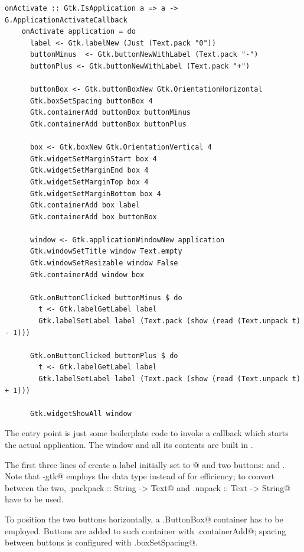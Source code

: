 \documentclass[UdineBachThesis,american,11pt,draft]{PhdThesis}
\begin{document}
  \begin{lstlisting}[gobble=4,basicstyle=\ttfamily\small]
    onActivate :: Gtk.IsApplication a => a -> G.ApplicationActivateCallback
    onActivate application = do
      label <- Gtk.labelNew (Just (Text.pack "0"))
      buttonMinus  <- Gtk.buttonNewWithLabel (Text.pack "-")
      buttonPlus <- Gtk.buttonNewWithLabel (Text.pack "+")

      buttonBox <- Gtk.buttonBoxNew Gtk.OrientationHorizontal
      Gtk.boxSetSpacing buttonBox 4
      Gtk.containerAdd buttonBox buttonMinus
      Gtk.containerAdd buttonBox buttonPlus

      box <- Gtk.boxNew Gtk.OrientationVertical 4
      Gtk.widgetSetMarginStart box 4
      Gtk.widgetSetMarginEnd box 4
      Gtk.widgetSetMarginTop box 4
      Gtk.widgetSetMarginBottom box 4
      Gtk.containerAdd box label
      Gtk.containerAdd box buttonBox

      window <- Gtk.applicationWindowNew application
      Gtk.windowSetTitle window Text.empty
      Gtk.windowSetResizable window False
      Gtk.containerAdd window box

      Gtk.onButtonClicked buttonMinus $ do
        t <- Gtk.labelGetLabel label
        Gtk.labelSetLabel label (Text.pack (show (read (Text.unpack t) - 1)))

      Gtk.onButtonClicked buttonPlus $ do
        t <- Gtk.labelGetLabel label
        Gtk.labelSetLabel label (Text.pack (show (read (Text.unpack t) + 1)))

      Gtk.widgetShowAll window
  \end{lstlisting}

  The entry point \lstinline@main@ is just some boilerplate code to invoke a
  callback which starts the actual application. The window and all its contents
  are built in \lstinline@onActivate@.

  The first three lines of \lstinline@onActivate@ create a label initially set
  to @ and two buttons: \lstinline@buttonMinus@ and
  \lstinline@buttonPlus@. Note that \lstinline@gi-gtk@ employs the
  \lstinline@Text@ data type instead of \lstinline@String@ for efficiency;
  to convert between the two, \lstinline@Text.packpack :: String -> Text@ and
  \lstinline@Text.unpack :: Text -> String@ have to be used.

  To position the two buttons horizontally, a \lstinline@Gtk.ButtonBox@
  container has to be employed. Buttons are added to such container with
  \lstinline@Gtk.containerAdd@; spacing between buttons is configured with
  \lstinline@Gtk.boxSetSpacing@.
\end{document}

